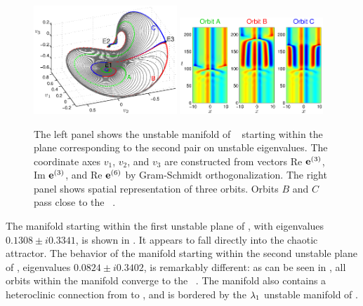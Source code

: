 \begin{figure}[t]
\begin{center}
\includegraphics[width=0.48\textwidth]{figs/ks22_E1_plane2_manifold.eps}
\includegraphics[width=0.48\textwidth]{figs/ks22_E1_plane2_orbits.eps}
\end{center}
\caption{
The left panel shows the unstable
manifold of \eqv\  starting within the plane
corresponding to the second pair on unstable eigenvalues. The
coordinate axes $v_1$, $v_2$, and $v_3$ are constructed from vectors
Re $\jEigvec{3}$, Im $\jEigvec{3}$, and Re $\jEigvec{6}$ 
by Gram-Schmidt orthogonalization.
The right panel shows spatial representation of three orbits. Orbits
$B$ and $C$ pass close to the \eqv\ .
   }
\label{f:KS22E1man2}
\end{figure}

The manifold starting within the first unstable plane of , with
eigenvalues $0.1308\pm i0.3341$, is shown in
. It appears to fall directly into the
chaotic attractor.  The behavior of the manifold starting within
the second unstable plane of , eigenvalues $0.0824\pm i0.3402$, is
remarkably different: as can be seen in ,
all orbits within the manifold converge to the \eqv\ .  The
manifold also contains a heteroclinic connection from  to ,
and is bordered by the $\eigExp[1]$ unstable manifold of .

